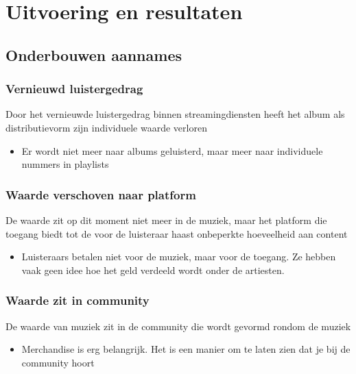 \section{Uitvoering en resultaten}

\subsection{Onderbouwen aannames}

\subsubsection*{Vernieuwd luistergedrag}

\begin{quotebox}
Door het vernieuwde luistergedrag binnen streamingdiensten heeft het album als distributievorm zijn individuele waarde verloren
\end{quotebox}
\begin{itemize}
  \item Er wordt niet meer naar albums geluisterd, maar meer naar individuele nummers in playlists
\end{itemize}

\subsubsection*{Waarde verschoven naar platform}
\begin{quotebox}
De waarde zit op dit moment niet meer in de muziek, maar het platform die toegang biedt tot de voor de luisteraar haast onbeperkte hoeveelheid aan content
\end{quotebox}
\begin{itemize}
  \item Luisteraars betalen niet voor de muziek, maar voor de toegang. Ze hebben vaak geen idee hoe het geld verdeeld wordt onder de artiesten.
\end{itemize}

\subsubsection*{Waarde zit in community}
\begin{quotebox}
De waarde van muziek zit in de community die wordt gevormd rondom de muziek
\end{quotebox}
\begin{itemize}
  \item Merchandise is erg belangrijk. Het is een manier om te laten zien dat je bij de community hoort
\end{itemize}

